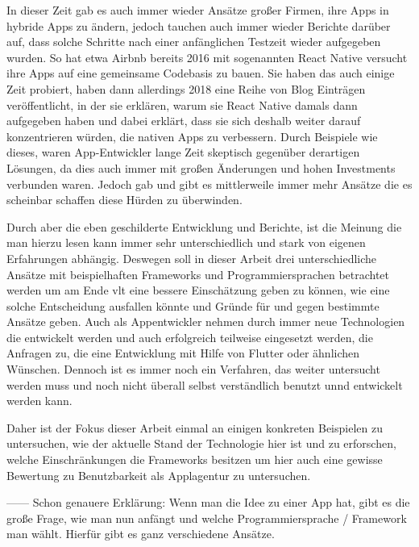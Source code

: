 In dieser Zeit gab es auch immer wieder Ansätze großer Firmen, ihre Apps in hybride Apps zu ändern, jedoch tauchen auch immer wieder Berichte darüber auf, dass solche Schritte nach einer anfänglichen Testzeit wieder aufgegeben wurden. So hat etwa Airbnb bereits 2016 mit sogenannten React Native versucht ihre Apps auf eine gemeinsame Codebasis zu bauen. Sie haben das auch einige Zeit probiert, haben dann allerdings 2018 eine Reihe von Blog Einträgen veröffentlicht, in der sie erklären, warum sie React Native damals dann aufgegeben haben und dabei erklärt, dass sie sich deshalb weiter darauf konzentrieren würden, die nativen Apps zu verbessern. 
Durch Beispiele wie dieses, waren App-Entwickler lange Zeit skeptisch gegenüber derartigen Lösungen, da dies auch immer mit großen Änderungen und hohen Investments verbunden waren.
Jedoch gab und gibt es mittlerweile immer mehr Ansätze die es scheinbar schaffen diese Hürden zu überwinden.
\cite{MaiThiNguyenKim.}

Durch aber die eben geschilderte Entwicklung und Berichte, ist die Meinung die man hierzu lesen kann immer sehr unterschiedlich und stark von eigenen Erfahrungen abhängig. 
Deswegen soll in dieser Arbeit drei unterschiedliche Ansätze mit beispielhaften Frameworks und Programmiersprachen betrachtet werden um am Ende vlt eine bessere Einschätzung geben zu können, wie eine solche Entscheidung ausfallen könnte und Gründe für und gegen bestimmte Ansätze geben.
Auch als Appentwickler nehmen durch immer neue Technologien die entwickelt werden und auch erfolgreich teilweise eingesetzt werden, die Anfragen zu, die eine Entwicklung mit Hilfe von Flutter oder ähnlichen Wünschen. Dennoch ist es immer noch ein Verfahren, das weiter untersucht werden muss und noch nicht überall selbst verständlich benutzt unnd entwickelt werden kann.

Daher ist der Fokus dieser Arbeit einmal an einigen konkreten Beispielen zu untersuchen, wie der aktuelle Stand der Technologie hier ist und zu erforschen, welche Einschränkungen die Frameworks besitzen um hier auch eine gewisse Bewertung zu Benutzbarkeit als Applagentur zu untersuchen.

------
Schon genauere Erklärung:
Wenn man die Idee zu einer App hat, gibt es die große Frage, wie man nun anfängt und welche Programmiersprache / Framework man wählt. Hierfür gibt es ganz verschiedene Ansätze.  

